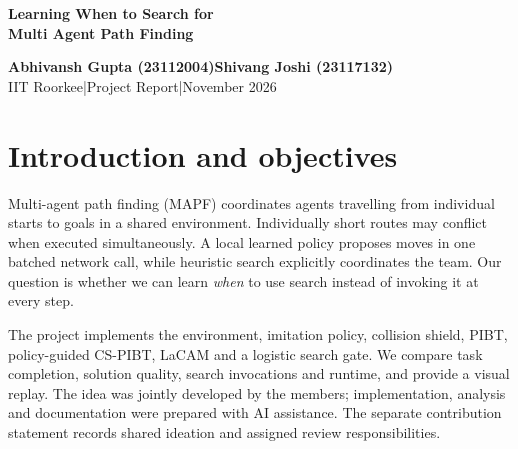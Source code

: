 \documentclass[10pt,a4paper]{article}
\begin{document}
\begin{center}
{\LARGE\bfseries Learning When to Search for\\[3pt] Multi Agent Path Finding}\par
\vspace{5pt}{\large A gated hybrid of learned policies and heuristic search}\par
\vspace{8pt}\textbf{Abhivansh Gupta (23112004)\quad Shivang Joshi (23117132)}\\
IIT Roorkee\quad |\quad Project Report\quad |\quad November 2026
\end{center}
\begin{abstract}
Local learned policies select actions quickly but can produce persistent coordination failures. We implement a hybrid of a shielded imitation policy, policy-guided priority inheritance with backtracking (CS-PIBT), and a budgeted LaCAM fallback. A logistic gate uses sixteen features and labels from eight-step search-versus-policy rollouts. On 140 unseen random-grid instances with 16--192 agents, the hybrid solves all tested instances while using approximately 23--57\% fewer external CS-PIBT calls than always-search. At 192 agents, its common-subset flowtime ratio is 1.601, versus 2.286 for random gating with fallback. However, without fallback, random triggering is stronger across much of the observed rate range. Plain LaCAM is also faster on these maps. The results demonstrate selective coordination and its limitations, rather than a new optimal solver or a general speed advantage.
\end{abstract}
\section{Introduction and objectives}
Multi-agent path finding (MAPF) coordinates agents travelling from individual starts to goals in a shared environment. Individually short routes may conflict when executed simultaneously. A local learned policy proposes moves in one batched network call, while heuristic search explicitly coordinates the team. Our question is whether we can learn \emph{when} to use search instead of invoking it at every step.

The project implements the environment, imitation policy, collision shield, PIBT, policy-guided CS-PIBT, LaCAM and a logistic search gate. We compare task completion, solution quality, search invocations and runtime, and provide a visual replay. The idea was jointly developed by the members; implementation, analysis and documentation were prepared with AI assistance. The separate contribution statement records shared ideation and assigned review responsibilities.
\end{document}
